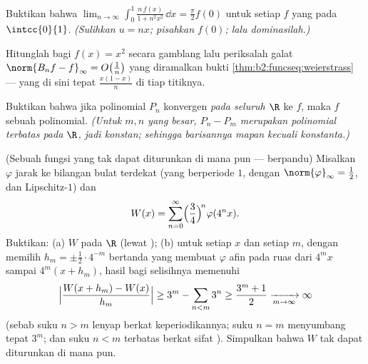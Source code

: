 \begin{exercise}[$\star\star$]\label{exo:b2:funcseq:6}
Buktikan bahwa $\displaystyle\lim_{n\to\infty} \int_0^1
\frac{n\,f(x)}{1 + n^2x^2}\,\dd x = \frac{\pi}{2} f(0)$ untuk setiap
$f$ yang  pada $\intcc{0}{1}$. \emph{(Sulihkan $u = nx$; pisahkan
$f(0)$; lalu dominasilah.)}
\end{exercise}

\begin{exercise}[$\star\star$]\label{exo:b2:funcseq:7}
Hitunglah  bagi $f(x) = x^2$ secara gamblang lalu
periksalah galat  $\norm{B_n f - f}_\infty =
O\bigl(\frac1n\bigr)$ yang diramalkan bukti
\cref{thm:b2:funcseq:weierstrass} --- yang di sini tepat $\frac{x(1 -
x)}{n}$ di tiap titiknya.
\end{exercise}

\begin{exercise}[$\star\star$]\label{exo:b2:funcseq:8}
Buktikan bahwa jika polinomial $P_n$ konvergen  \emph{pada
seluruh $\R$} ke $f$, maka $f$ sebuah polinomial. \emph{(Untuk $m, n$
yang besar, $P_n - P_m$ merupakan polinomial terbatas pada $\R$, jadi
konstan; sehingga barisannya mapan kecuali konstanta.)}
\end{exercise}

\begin{exercise}[$\star\star\star$]\label{exo:b2:funcseq:9}
(Sebuah fungsi  yang tak dapat diturunkan di mana pun ---
berpandu) Misalkan $\varphi$ jarak ke bilangan bulat terdekat (yang
berperiode $1$, dengan $\norm{\varphi}_\infty = \frac12$, dan
Lipschitz-$1$) dan
\[
W(x) = \sum_{n=0}^{\infty} \Bigl(\frac{3}{4}\Bigr)^{\!n}
\varphi(4^n x) .
\]
Buktikan: (a) $W$  pada $\R$ (lewat ); (b)
untuk setiap $x$ dan setiap $m$, dengan memilih $h_m = \pm\frac12\cdot
4^{-m}$ bertanda yang membuat $\varphi$ afin pada ruas dari $4^m x$
sampai $4^m(x + h_m)$, hasil bagi selisihnya memenuhi
\[
\Bigl|\frac{W(x + h_m) - W(x)}{h_m}\Bigr| \geq 3^m -
\sum_{n<m} 3^n \geq \frac{3^m + 1}{2} \xrightarrow[m\to\infty]{}
\infty
\]
(sebab suku $n > m$ lenyap berkat keperiodikannya; suku $n = m$
menyumbang tepat $3^m$; dan suku $n < m$ terbatas berkat sifat
). Simpulkan bahwa $W$ tak dapat diturunkan di mana pun.
\end{exercise}

